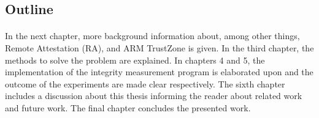 \subsection*{Outline}

\paragraph*{}
In the next chapter, more background information about, among other things, Remote Attestation (RA), and ARM TrustZone is given. In the third chapter, the methods to solve the problem are explained. In chapters 4 and 5, the implementation of the integrity measurement program is elaborated upon and the outcome of the experiments are made clear respectively. The sixth chapter includes a discussion about this thesis informing the reader about related work and future work. The final chapter concludes the presented work.
